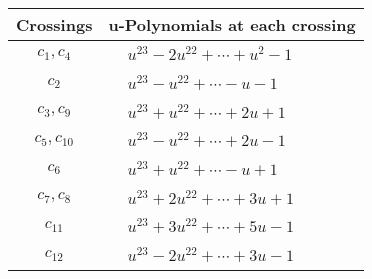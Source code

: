 \documentclass[1p]{elsarticle_modified}
\theoremstyle{definition}
\begin{document}
\begin{tabular}{m{50pt}|m{274pt}}
Crossings & \hspace{64pt}u-Polynomials at each crossing \\
\hline $$\begin{aligned}c_{1},c_{4}\end{aligned}$$&$\begin{aligned}
&u^{23}-2 u^{22}+\cdots+u^2-1
\end{aligned}$\\
\hline $$\begin{aligned}c_{2}\end{aligned}$$&$\begin{aligned}
&u^{23}- u^{22}+\cdots- u-1
\end{aligned}$\\
\hline $$\begin{aligned}c_{3},c_{9}\end{aligned}$$&$\begin{aligned}
&u^{23}+u^{22}+\cdots+2 u+1
\end{aligned}$\\
\hline $$\begin{aligned}c_{5},c_{10}\end{aligned}$$&$\begin{aligned}
&u^{23}- u^{22}+\cdots+2 u-1
\end{aligned}$\\
\hline $$\begin{aligned}c_{6}\end{aligned}$$&$\begin{aligned}
&u^{23}+u^{22}+\cdots- u+1
\end{aligned}$\\
\hline $$\begin{aligned}c_{7},c_{8}\end{aligned}$$&$\begin{aligned}
&u^{23}+2 u^{22}+\cdots+3 u+1
\end{aligned}$\\
\hline $$\begin{aligned}c_{11}\end{aligned}$$&$\begin{aligned}
&u^{23}+3 u^{22}+\cdots+5 u-1
\end{aligned}$\\
\hline $$\begin{aligned}c_{12}\end{aligned}$$&$\begin{aligned}
&u^{23}-2 u^{22}+\cdots+3 u-1
\end{aligned}$\\
\hline
\end{tabular}\\~\\
\end{document}

